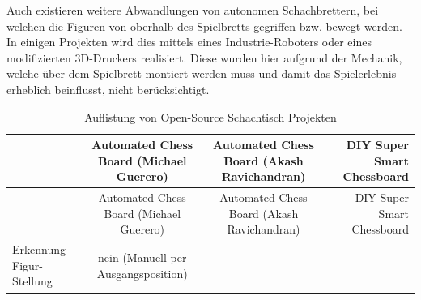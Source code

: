 Auch existieren weitere Abwandlungen von autonomen Schachbrettern, bei
welchen die Figuren von oberhalb des Spielbretts gegriffen bzw. bewegt
werden. In einigen Projekten wird dies mittels eines Industrie-Roboters
\cite{actprojectrobot} oder eines modifizierten
3D-Druckers\cite{atcproject3dprinter} realisiert. Diese wurden hier
aufgrund der Mechanik, welche über dem Spielbrett montiert werden muss
und damit das Spielerlebnis erheblich beinflusst, nicht berücksichtigt.

\begin{longtable}[]{@{}lccr@{}}
\caption{Auflistung von Open-Source Schachtisch Projekten
\label{oschesstables}}\tabularnewline
\toprule
\begin{minipage}[b]{0.19\columnwidth}\raggedright
\strut
\end{minipage} & \begin{minipage}[b]{0.25\columnwidth}\centering
Automated Chess Board (Michael Guerero) \cite{actproject1}\strut
\end{minipage} & \begin{minipage}[b]{0.26\columnwidth}\centering
Automated Chess Board (Akash Ravichandran) \cite{actproject2}\strut
\end{minipage} & \begin{minipage}[b]{0.19\columnwidth}\raggedleft
DIY Super Smart Chessboard \cite{actproject3}\strut
\end{minipage}\tabularnewline
\midrule
\endfirsthead
\toprule
\begin{minipage}[b]{0.19\columnwidth}\raggedright
\strut
\end{minipage} & \begin{minipage}[b]{0.25\columnwidth}\centering
Automated Chess Board (Michael Guerero) \cite{actproject1}\strut
\end{minipage} & \begin{minipage}[b]{0.26\columnwidth}\centering
Automated Chess Board (Akash Ravichandran) \cite{actproject2}\strut
\end{minipage} & \begin{minipage}[b]{0.19\columnwidth}\raggedleft
DIY Super Smart Chessboard \cite{actproject3}\strut
\end{minipage}\tabularnewline
\midrule
\endhead
\begin{minipage}[t]{0.19\columnwidth}\raggedright
Erkennung Figur-Stellung\strut
\end{minipage} & \begin{minipage}[t]{0.25\columnwidth}\centering
nein (Manuell per Ausgangsposition)\strut

\end{minipage}
\end{longtable}

